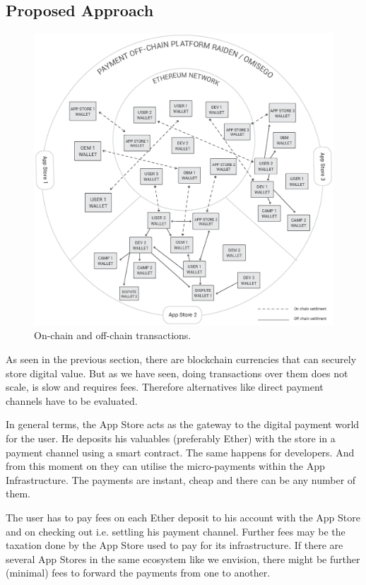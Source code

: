 \subsection{Proposed Approach}


\begin{figure}[!ht]
\centering
\includegraphics[width=\textwidth]{diagrams/offchain_wallets.eps}
\caption{On-chain and off-chain transactions.}
\label{fig:offchain}
\end{figure}


As seen in the previous section, there are blockchain currencies that can securely store digital value. But as we have seen, doing transactions over them does not scale, is slow and requires fees. Therefore alternatives like direct payment channels have to be evaluated.

In general terms, the App Store acts as the gateway to the digital payment world for the user. He deposits his valuables (preferably Ether) with the store in a payment channel using a smart contract. The same happens for developers. And from this moment on they can utilise the micro-payments within the App Infrastructure. The payments are instant, cheap and there can be any number of them.

The user has to pay fees on each Ether deposit to his account with the App Store and on checking out i.e. settling his payment channel. Further fees may be the taxation done by the App Store used to pay for its infrastructure.  If there are several App Stores in the same ecosystem like we envision, there might be further (minimal) fees to forward the payments from one to another.

